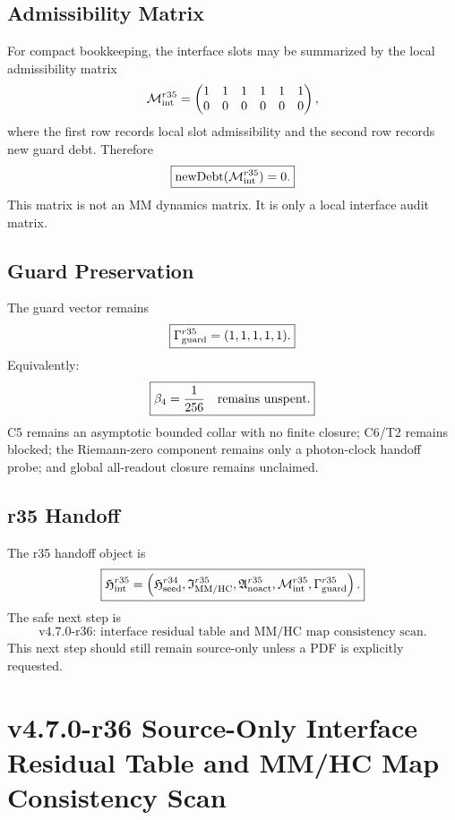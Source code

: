 \subsection{Admissibility Matrix}
\label{subsec:r35-admissibility-matrix}

For compact bookkeeping, the interface slots may be summarized by the local
admissibility matrix
\[
\mathcal M_{\rm int}^{r35}
=
\begin{pmatrix}
1&1&1&1&1&1\\
0&0&0&0&0&0
\end{pmatrix},
\]
where the first row records local slot admissibility and the second row records
new guard debt.  Therefore
\[
\boxed{
\operatorname{newDebt}(\mathcal M_{\rm int}^{r35})=0.
}
\]
This matrix is not an MM dynamics matrix.  It is only a local interface audit
matrix.

\subsection{Guard Preservation}
\label{subsec:r35-guard-preservation}

The guard vector remains
\[
\boxed{
\Gamma_{\rm guard}^{r35}=(1,1,1,1,1).
}
\]
Equivalently:
\[
\boxed{
\beta_4=\frac1{256}\quad\hbox{remains unspent.}
}
\]
C5 remains an asymptotic bounded collar with no finite closure; C6/T2 remains
blocked; the Riemann-zero component remains only a photon-clock handoff probe;
and global all-readout closure remains unclaimed.

\subsection{r35 Handoff}
\label{subsec:r35-handoff}

The r35 handoff object is
\[
\boxed{
\mathfrak H_{\rm int}^{r35}
=
\left(
\mathfrak H_{\rm seed}^{r34},
\mathfrak I_{\rm MM/HC}^{r35},
\mathfrak A_{\rm noact}^{r35},
\mathcal M_{\rm int}^{r35},
\Gamma_{\rm guard}^{r35}
\right).
}
\]
The safe next step is
\[
\boxed{
\text{v4.7.0-r36: interface residual table and MM/HC map consistency scan.}
}
\]
This next step should still remain source-only unless a PDF is explicitly
requested.


\section{v4.7.0-r36 Source-Only Interface Residual Table and MM/HC Map Consistency Scan}
\label{sec:v470-r36-interface-residual-consistency}

